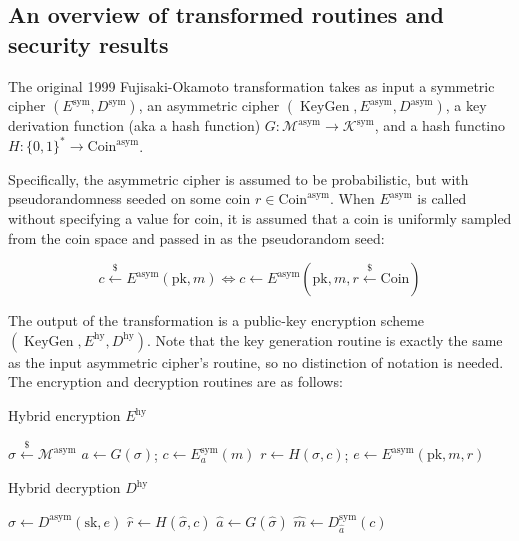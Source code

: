 \documentclass{article}
\newcommand{\leftsample}{\overset{{\scriptscriptstyle\$}}{\leftarrow}}
\begin{document}
\subsection{An overview of transformed routines and security results}
The original 1999 Fujisaki-Okamoto transformation takes as input a symmetric cipher $(E^\text{sym}, D^\text{sym})$, an asymmetric cipher $(\operatorname{KeyGen}, E^\text{asym}, D^\text{asym})$, a key derivation function (aka a hash function) $G: \mathcal{M}^\text{asym} \rightarrow \mathcal{K}^\text{sym}$, and a hash functino $H: \{0, 1\}^\ast \rightarrow \text{Coin}^\text{asym}$.

Specifically, the asymmetric cipher is assumed to be probabilistic, but with pseudorandomness seeded on some coin $r \in \text{Coin}^\text{asym}$. When $E^\text{asym}$ is called without specifying a value for coin, it is assumed that a coin is uniformly sampled from the coin space and passed in as the pseudorandom seed:

$$
    c \leftsample E^\text{asym}(\text{pk}, m) 
    \Leftrightarrow 
    c \leftarrow E^\text{asym}(\text{pk}, m, r \leftsample \text{Coin})
$$

The output of the transformation is a public-key encryption scheme $(\operatorname{KeyGen}, E^\text{hy}, D^\text{hy})$. Note that the key generation routine is exactly the same as the input asymmetric cipher's routine, so no distinction of notation is needed. The encryption and decryption routines are as follows:


\begin{multicols}{2}
    \begin{algorithm}[H]
        \SetAlgoLined
        \caption{Hybrid encryption $E^\text{hy}$}
        $\sigma \leftsample \mathcal{M}^\text{asym}$\;
        $a \leftarrow G(\sigma)$; $c \leftarrow E^\text{sym}_a(m)$\;
        $r \leftarrow H(\sigma, c)$;
        $e \leftarrow E^\text{asym}(\text{pk}, m, r)$\;
        \;
    \end{algorithm}

    \columnbreak

    \begin{algorithm}[H]\label{hybrid-decryption-99}
        \SetAlgoLined
        \caption{Hybrid decryption $D^\text{hy}$}
        $\hat{\sigma} \leftarrow D^\text{asym}(\text{sk}, e)$\;
        $\hat{r} \leftarrow H(\hat{\sigma}, c)$\;
        $\hat{a} \leftarrow G(\hat{\sigma})$\;
        $\hat{m} \leftarrow D^\text{sym}_{\hat{a}}(c)$\;
        \;
    \end{algorithm}
\end{multicols}
\end{document}
